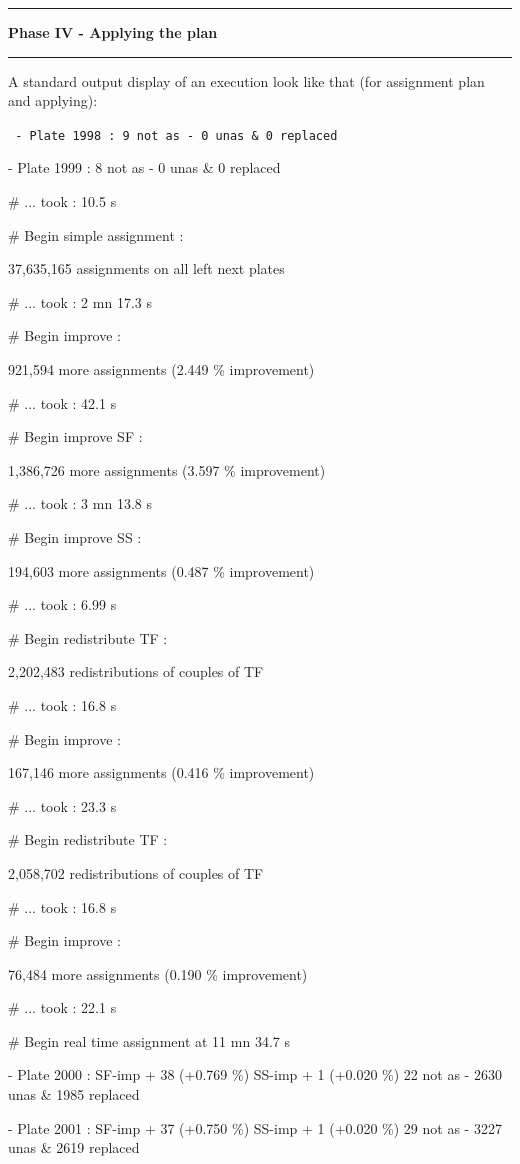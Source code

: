 \documentclass{extarticle}
\newcommand\Algphase[1]{%
\vspace*{-.7\baselineskip}\Statex\hspace*{\dimexpr-\algorithmicindent-2pt\relax}\rule{\linewidth}{0.4pt}%
\Statex\hspace*{-\algorithmicindent}\textbf{#1}%
\vspace*{-.7\baselineskip}\Statex\hspace*{\dimexpr-\algorithmicindent-2pt\relax}\rule{\linewidth}{0.4pt}%
}
\begin{document}
\begin{multicols}{2}
\begin{algorithm}[H]
	\begin{algorithmic}[1]
		\Algphase{Phase IV - Applying the plan}
	\end{algorithmic}
\end{algorithm}


A standard output display of an execution look like that (for assignment plan and applying):
{\tt 
 - Plate 1998 :      9 not as -     0 unas \&    0 replaced

 - Plate 1999 :      8 not as -     0 unas \&    0 replaced

\# ... took : 10.5 s

\# Begin simple assignment :

  37,635,165 assignments on all left next plates

\# ... took : 2 mn 17.3 s

\# Begin improve :

  921,594 more assignments (2.449 \% improvement)

\# ... took : 42.1 s

\# Begin improve SF :

  1,386,726 more assignments (3.597 \% improvement)

\# ... took : 3 mn 13.8 s

\# Begin improve SS :

  194,603 more assignments (0.487 \% improvement)

\# ... took : 6.99 s

\# Begin redistribute TF :

  2,202,483 redistributions of couples of TF

\# ... took : 16.8 s

\# Begin improve :

  167,146 more assignments (0.416 \% improvement)

\# ... took : 23.3 s

\# Begin redistribute TF :

  2,058,702 redistributions of couples of TF

\# ... took : 16.8 s

\# Begin improve :

  76,484 more assignments (0.190 \% improvement)

\# ... took : 22.1 s

\# Begin real time assignment at 11 mn 34.7 s

 - Plate 2000 : SF-imp + 38 (+0.769 \%) SS-imp +  1 (+0.020 \%)    22 not as -  2630 unas \& 1985 replaced

 - Plate 2001 : SF-imp + 37 (+0.750 \%) SS-imp +  1 (+0.020 \%)    29 not as -  3227 unas \& 2619 replaced

}
\end{multicols}
\end{document}
